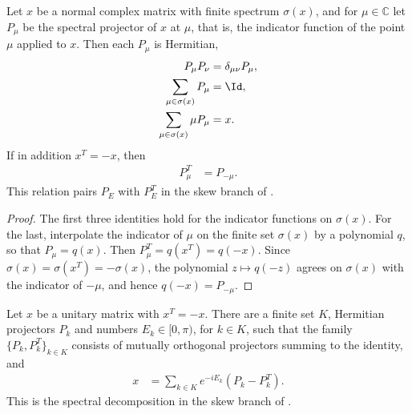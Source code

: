 \begin{lemma}
    \label{lem:mpu_transpose_spectral_projector}
    \leanok
    Let $x$ be a normal complex matrix with finite spectrum $\sigma(x)$, and for
    $\mu\in\mathbb C$ let $P_\mu$ be the spectral projector of $x$ at $\mu$,
    that is, the indicator function of the point $\mu$ applied to $x$. Then
    each $P_\mu$ is Hermitian,
    \begin{align}
        P_\mu P_\nu                     & =\delta_{\mu\nu}P_\mu, \\
        \sum_{\mu\in\sigma(x)}P_\mu     & =\Id,                  \\
        \sum_{\mu\in\sigma(x)}\mu P_\mu & =x.
    \end{align}
    If in addition $x^T=-x$, then
    \begin{align}
        P_\mu^T & =P_{-\mu}.
    \end{align}
    This relation pairs $P_E$ with $P_E^T$ in the skew branch of
    \cite[Lemma~\texttt{lemma:conjclass-normalform-continuous}]{Cirac2017MPU}.
\end{lemma}

\begin{proof}\leanok
    The first three identities hold for the indicator functions on
    $\sigma(x)$. For the last, interpolate the indicator of $\mu$ on the
    finite set $\sigma(x)$ by a polynomial $q$, so that $P_\mu=q(x)$. Then
    $P_\mu^T=q(x^T)=q(-x)$. Since $\sigma(x)=\sigma(x^T)=-\sigma(x)$, the
    polynomial $z\mapsto q(-z)$ agrees on $\sigma(x)$ with the indicator of
    $-\mu$, and hence $q(-x)=P_{-\mu}$.
\end{proof}

\begin{lemma}
    \label{lem:mpu_skew_unitary_paired_spectral_data}
    \leanok
    Let $x$ be a unitary matrix with $x^T=-x$. There are a finite set $K$,
    Hermitian projectors $P_k$ and numbers $E_k\in[0,\pi)$, for $k\in K$,
    such that the family $\{P_k,P_k^T\}_{k\in K}$ consists of mutually
    orthogonal projectors summing to the identity, and
    \begin{align}
        x & = \sum_{k\in K} e^{-iE_k}(P_k-P_k^T).
    \end{align}
    This is the spectral decomposition in the skew branch of
    \cite[Lemma~\texttt{lemma:conjclass-normalform-continuous}]{Cirac2017MPU}.
\end{lemma}

